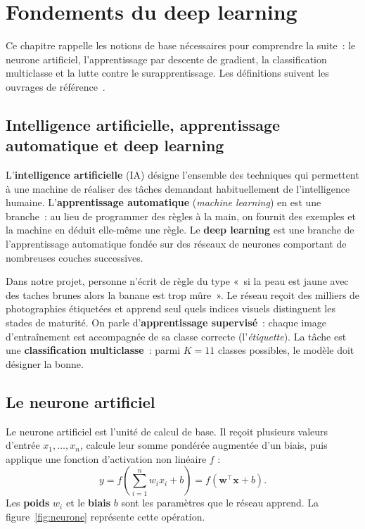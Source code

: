 \chapter{Fondements du deep learning}\label{chap:dl}

Ce chapitre rappelle les notions de base nécessaires pour comprendre la suite~: le neurone artificiel, l’apprentissage par descente de gradient, la classification multiclasse et la lutte contre le surapprentissage. Les définitions suivent les ouvrages de référence~\cite{goodfellow2016}.

\section{Intelligence artificielle, apprentissage automatique et deep learning}

L’\textbf{intelligence artificielle} (IA) désigne l’ensemble des techniques qui permettent à une machine de réaliser des tâches demandant habituellement de l’intelligence humaine. L’\textbf{apprentissage automatique} (\emph{machine learning}) en est une branche~: au lieu de programmer des règles à la main, on fournit des exemples et la machine en déduit elle-même une règle. Le \textbf{deep learning} est une branche de l’apprentissage automatique fondée sur des réseaux de neurones comportant de nombreuses couches successives.

Dans notre projet, personne n’écrit de règle du type «~si la peau est jaune avec des taches brunes alors la banane est trop mûre~». Le réseau reçoit des milliers de photographies étiquetées et apprend seul quels indices visuels distinguent les stades de maturité. On parle d’\textbf{apprentissage supervisé}~: chaque image d’entraînement est accompagnée de sa classe correcte (l’\emph{étiquette}). La tâche est une \textbf{classification multiclasse}~: parmi $K=11$ classes possibles, le modèle doit désigner la bonne.

\section{Le neurone artificiel}

Le neurone artificiel est l’unité de calcul de base. Il reçoit plusieurs valeurs d’entrée $x_1,\dots,x_n$, calcule leur somme pondérée augmentée d’un biais, puis applique une fonction d’activation non linéaire $f$ :
\begin{equation}
  y = f\!\left(\sum_{i=1}^{n} w_i x_i + b\right) = f(\mathbf{w}^{\top}\mathbf{x} + b).
\end{equation}
Les \textbf{poids} $w_i$ et le \textbf{biais} $b$ sont les paramètres que le réseau apprend. La figure~\ref{fig:neurone} représente cette opération.

